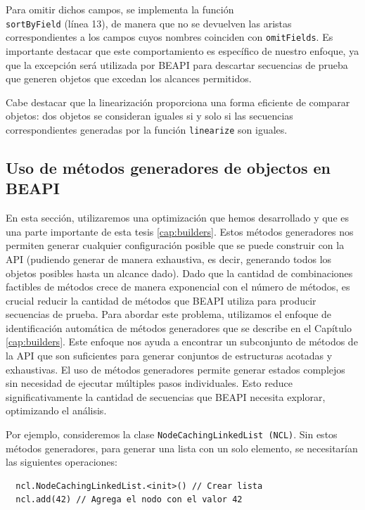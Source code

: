 Para omitir dichos campos, se implementa la función \\
\texttt{sortByField} (línea 13), de manera que no se devuelven las aristas correspondientes a los campos cuyos nombres coinciden con \texttt{omitFields}. 
Es importante destacar que este comportamiento es específico de nuestro enfoque, ya que la excepción será utilizada por \textsf{BEAPI} para descartar secuencias de prueba que generen objetos que excedan los alcances permitidos.

Cabe destacar que la linearización proporciona una forma eficiente de comparar objetos: dos objetos se consideran iguales si y solo si las secuencias correspondientes generadas por la función \texttt{linearize} son iguales.


\subsection{Uso de m\'etodos generadores de objectos en BEAPI}
\label{sec:buildersOptimization}
En esta sección, utilizaremos una optimización que hemos desarrollado y que es una parte importante de esta tesis \ref{cap:builders}. 
Estos métodos generadores nos permiten generar cualquier configuración posible que se puede construir con la API (pudiendo generar de manera exhaustiva, es decir, generando todos los objetos posibles hasta un alcance dado).
Dado que la cantidad de combinaciones factibles de métodos crece de manera exponencial con el número de métodos,
es crucial reducir la cantidad de métodos que \textsf{BEAPI} utiliza para producir secuencias de prueba. Para abordar este problema, 
utilizamos el enfoque de identificación automática de métodos generadores que se describe en el Capítulo \ref{cap:builders}.
Este enfoque nos ayuda a encontrar un subconjunto de métodos de la API que son suficientes para generar conjuntos de estructuras acotadas y exhaustivas. 
El uso de métodos generadores permite generar estados complejos sin necesidad de ejecutar múltiples pasos individuales. Esto reduce significativamente la cantidad de secuencias que BEAPI necesita explorar, optimizando el análisis. 

Por ejemplo, consideremos la clase \texttt{NodeCachingLinkedList (NCL)}. 
Sin estos m\'etodos generadores, para generar una lista con un solo elemento, se necesitarían las siguientes operaciones:
\vspace{1em}
\begin{lstlisting}
  ncl.NodeCachingLinkedList.<init>() // Crear lista
  ncl.add(42) // Agrega el nodo con el valor 42
\end{lstlisting}

